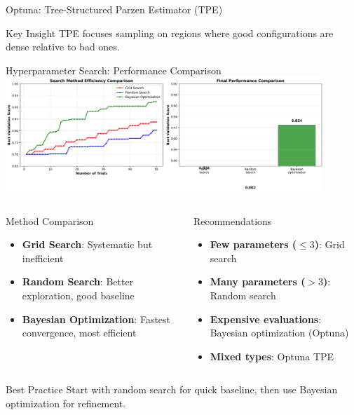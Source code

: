 \documentclass[8pt,aspectratio=1610]{beamer}
\begin{document}
\begin{frame}{Optuna: Tree-Structured Parzen Estimator (TPE)}
\vspace{0.3cm}

\begin{alertblock}{Key Insight}
TPE focuses sampling on regions where good configurations are dense relative to bad ones.
\end{alertblock}
\end{frame}

\begin{frame}{Hyperparameter Search: Performance Comparison}
\centering
\includegraphics[width=0.9\textwidth]{../figures/search_efficiency_comparison.png}

\vspace{0.3cm}

\begin{columns}[t]
\begin{column}{0.48\textwidth}
\begin{block}{Method Comparison}
\begin{itemize}
\setlength{\itemsep}{3pt}
\item \textbf{Grid Search}: Systematic but inefficient
\item \textbf{Random Search}: Better exploration, good baseline
\item \textbf{Bayesian Optimization}: Fastest convergence, most efficient
\end{itemize}
\end{block}
\end{column}

\begin{column}{0.48\textwidth}
\begin{block}{Recommendations}
\begin{itemize}
\setlength{\itemsep}{3pt}
\item \textbf{Few parameters ($\leq 3$)}: Grid search
\item \textbf{Many parameters ($> 3$)}: Random search
\item \textbf{Expensive evaluations}: Bayesian optimization (Optuna)
\item \textbf{Mixed types}: Optuna TPE
\end{itemize}
\end{block}
\end{column}
\end{columns}

\begin{alertblock}{Best Practice}
Start with random search for quick baseline, then use Bayesian optimization for refinement.
\end{alertblock}
\end{frame}
\end{document}
